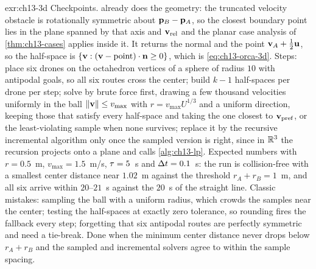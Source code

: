 \begin{solution}{exr:ch13-3d}
Checkpoints.  already does the geometry: the truncated
velocity obstacle is rotationally symmetric about $\mathbf{p}_B-\mathbf{p}_A$, so the closest boundary
point lies in the plane spanned by that axis and $\mathbf{v}_{\mathrm{rel}}$ and the planar case
analysis of \cref{thm:ch13-cases} applies inside it. It returns the normal and the point
$\mathbf{v}_A+\tfrac12\mathbf{u}$, so the half-space is $\left\{ \mathbf{v} :
(\mathbf{v}-\text{point})\cdot\mathbf{n}\ge0 \right\}$, which is \cref{eq:ch13-orca-3d}. Steps: place six
drones on the octahedron vertices of a sphere of radius $10$ with antipodal goals, so all
six routes cross the center; build $k-1$ half-spaces per drone per step; solve by brute
force first, drawing a few thousand velocities uniformly in the ball $\left\lVert \mathbf{v} \right\rVert\le
v_{\max}$ with $r=v_{\max}U^{1/3}$ and a uniform direction, keeping those that satisfy
every half-space and taking the one closest to $\mathbf{v}_{\mathrm{pref}}$, or the
least-violating sample when none survives; replace it by the recursive incremental
algorithm only once the sampled version is right, since in $\mathbb{R}^3$ the recursion projects
onto a plane and calls \cref{alg:ch13-lp}. Expected numbers with $r=0.5$~m,
$v_{\max}=1.5$~m/s, $\tau=5$~s and $\Delta t=0.1$~s: the run is collision-free with a smallest
center distance near $1.02$~m against the threshold $r_A+r_B=1$~m, and all six arrive
within $20$--$21$~s against the $20$~s of the straight line. Classic mistakes: sampling
the ball with a uniform radius, which crowds the samples near the center; testing the
half-spaces at exactly zero tolerance, so rounding fires the fallback every step;
forgetting that six antipodal routes are perfectly symmetric and need a tie-break. Done
when the minimum center distance never drops below $r_A+r_B$ and the sampled and
incremental solvers agree to within the sample spacing.
\end{solution}
